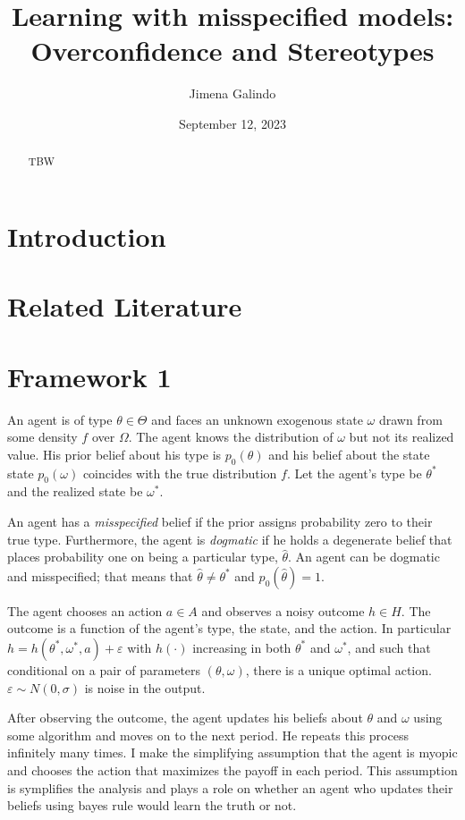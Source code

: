 \documentclass[
  12pt,
]{article}
\title{Learning with misspecified models: Overconfidence and
Stereotypes}
\author{Jimena Galindo}
\date{September 12, 2023}
\begin{document}
\maketitle
\begin{abstract}
TBW
\end{abstract}

\hypertarget{introduction}{%
\section{Introduction}\label{introduction}}

\hypertarget{related-literature}{%
\section{Related Literature}\label{related-literature}}

\hypertarget{framework-1}{%
\section{Framework 1}\label{framework-1}}

An agent is of type \(\theta \in \Theta\) and faces an unknown exogenous
state \(\omega\) drawn from some density \(f\) over \(\Omega\). The
agent knows the distribution of \(\omega\) but not its realized value.
His prior belief about his type is \(p_0(\theta)\) and his belief about
the state state \(p_0(\omega)\) coincides with the true distribution
\(f\). Let the agent's type be \(\theta^*\) and the realized state be
\(\omega^*\).

An agent has a \emph{misspecified} belief if the prior assigns
probability zero to their true type. Furthermore, the agent is
\emph{dogmatic} if he holds a degenerate belief that places probability
one on being a particular type, \(\hat{\theta}\). An agent can be
dogmatic and misspecified; that means that
\(\hat{\theta} \neq \theta^*\) and \(p_0(\hat{\theta}) = 1\).

The agent chooses an action \(a\in A\) and observes a noisy outcome
\(h\in H\). The outcome is a function of the agent's type, the state,
and the action. In particular
\(h = h(\theta^*, \omega^*, a) + \varepsilon\) with \(h(\cdot)\)
increasing in both \(\theta^*\) and \(\omega^*\), and such that
conditional on a pair of parameters \((\theta, \omega)\), there is a
unique optimal action. \(\varepsilon\sim N(0, \sigma)\) is noise in the
output.

After observing the outcome, the agent updates his beliefs about
\(\theta\) and \(\omega\) using some algorithm and moves on to the next
period. He repeats this process infinitely many times. I make the
simplifying assumption that the agent is myopic and chooses the action
that maximizes the payoff in each period. This assumption is symplifies
the analysis and plays a role on whether an agent who updates their
beliefs using bayes rule would learn the truth or not.
\end{document}
